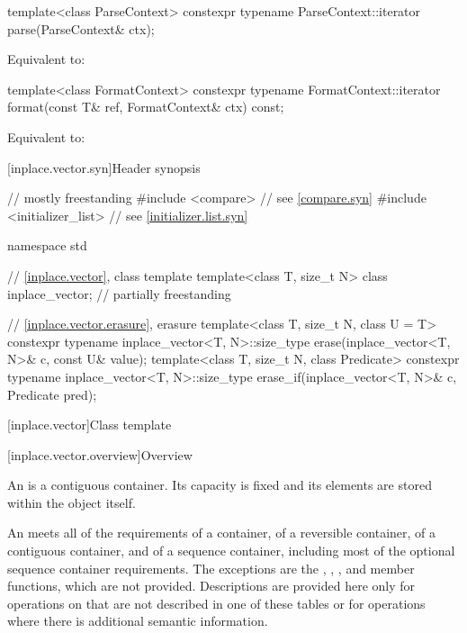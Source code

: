 %
\begin{itemdecl}
template<class ParseContext>
  constexpr typename ParseContext::iterator
    parse(ParseContext& ctx);
\end{itemdecl}

\begin{itemdescr}
\pnum
Equivalent to: 
\end{itemdescr}

%
\begin{itemdecl}
template<class FormatContext>
  constexpr typename FormatContext::iterator
    format(const T& ref, FormatContext& ctx) const;
\end{itemdecl}

\begin{itemdescr}
\pnum
Equivalent to: 
\end{itemdescr}

[inplace.vector.syn]{Header  synopsis}

%
\begin{codeblock}
// mostly freestanding
#include <compare>              // see \ref{compare.syn}
#include <initializer_list>     // see \ref{initializer.list.syn}

namespace std {
  // \ref{inplace.vector}, class template 
  template<class T, size_t N> class inplace_vector;             // partially freestanding

  // \ref{inplace.vector.erasure}, erasure
  template<class T, size_t N, class U = T>
    constexpr typename inplace_vector<T, N>::size_type
      erase(inplace_vector<T, N>& c, const U& value);
  template<class T, size_t N, class Predicate>
    constexpr typename inplace_vector<T, N>::size_type
      erase_if(inplace_vector<T, N>& c, Predicate pred);
}
\end{codeblock}

[inplace.vector]{Class template }

[inplace.vector.overview]{Overview}

\pnum
{}%
An  is a contiguous container.
Its capacity is fixed and
its elements are stored within the  object itself.

\pnum
An  meets all of the requirements
of a container,
of a reversible container,
of a contiguous container, and
of a sequence container,
including most of the optional sequence container requirements.
The exceptions are the
,
,
, and
member functions, which are not provided.
Descriptions are provided here only
for operations on  that
are not described in one of these tables or
for operations where there is additional semantic information.

